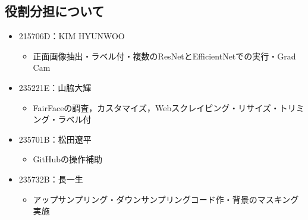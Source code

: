 \documentclass[a4paper,11pt,titlepage]{jsarticle}
\begin{document}
\subsection{役割分担について}
\begin{itemize}
    \item 215706D：KIM HYUNWOO
        \begin{itemize}
            \item 正面画像抽出・ラベル付・複数のResNetとEfficientNetでの実行・Grad Cam
        \end{itemize}
    \item 235221E：山脇大輝
        \begin{itemize}
            \item FairFaceの調査，カスタマイズ，Webスクレイピング・リサイズ・トリミング・ラベル付
        \end{itemize}
    \item 235701B：松田遼平
        \begin{itemize}
            \item GitHubの操作補助
        \end{itemize}
    \item 235732B：長一生
        \begin{itemize}
            \item アップサンプリング・ダウンサンプリングコード作・背景のマスキング実施
        \end{itemize}
\end{itemize}

\end{document}
